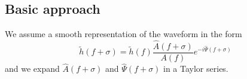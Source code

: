 \documentclass[aps,showpacs,twocolumn,prd,superscriptaddress,nofootinbib]{revtex4}
\newcommand{\be}{\begin{equation}}
\newcommand{\ee}{\end{equation}}
\begin{document}
\subsection{Basic approach}
We assume a smooth representation of the waveform in the form
%
\be
\tilde{h}(f+\sigma) = \tilde{h}(f)\frac{\hat A(f+\sigma)}{A(f)}e^{-i\hat\Psi(f+\sigma)}
\ee
%
and we expand $\hat A(f+\sigma)$ and $\hat\Psi(f+\sigma)$ in a Taylor series.


%

\end{document}
